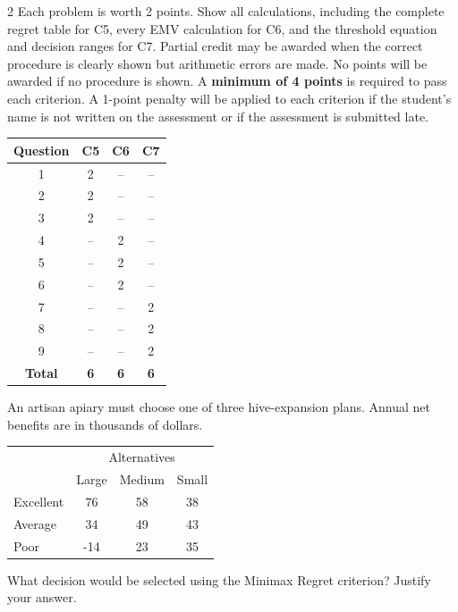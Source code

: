 	\StudentInfo

	\begin{multicols}{2}
		\raggedcolumns
		\vspace{-0.25cm}
		Each problem is worth 2 points. Show all calculations, including the complete regret table for C5, every EMV calculation for C6, and the threshold equation and decision ranges for C7. Partial credit may be awarded when the correct procedure is clearly shown but arithmetic errors are made. No points will be awarded if no procedure is shown.
		A \textbf{minimum of 4 points} is required to pass each criterion. A 1-point penalty will be applied to each criterion if the student's name is not written on the assessment or if the assessment is submitted late.

		\begin{center}
			\begin{tabular}{|c|c|c|c|}
				\hline
				\textbf{Question} & \textbf{C5} & \textbf{C6} & \textbf{C7} \\ \hline
				1 & 2 & -- & -- \\ \hline
				2 & 2 & -- & -- \\ \hline
				3 & 2 & -- & -- \\ \hline
				4 & -- & 2 & -- \\ \hline
				5 & -- & 2 & -- \\ \hline
				6 & -- & 2 & -- \\ \hline
				7 & -- & -- & 2 \\ \hline
				8 & -- & -- & 2 \\ \hline
				9 & -- & -- & 2 \\ \hline
				\textbf{Total} & \textbf{6} & \textbf{6} & \textbf{6} \\ \hline
			\end{tabular}
		\end{center}

		\columnbreak

		An artisan apiary must choose one of three hive-expansion plans. Annual net benefits are in thousands of dollars.\vspace{-3mm}
		\begin{center}
			\setlength{\tabcolsep}{3pt}
			\renewcommand{\arraystretch}{1.1}
			\begin{tabular}{lccc}
				\toprule
				& \multicolumn{3}{c}{Alternatives} \\
				& Large & Medium & Small \\ \midrule
				Excellent & 76 & 58 & 38 \\
				Average   & 34 & 49 & 43 \\
				Poor      & -14 & 23 & 35 \\ \bottomrule
			\end{tabular}
		\end{center}\vspace{-3mm}
		What decision would be selected using the Minimax Regret criterion? Justify your answer.


\end{multicols}
